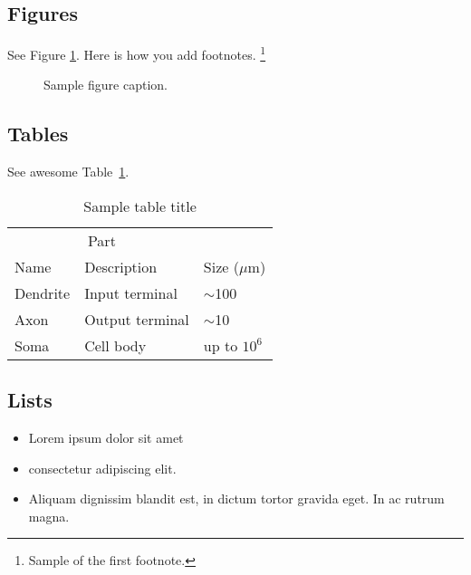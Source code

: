 \documentclass{article}
\begin{document}
\subsection{Figures}
\lipsum[10] 
See Figure \ref{fig:fig1}. Here is how you add footnotes. \footnote{Sample of the first footnote.}
\lipsum[11] 

\begin{figure}
  \centering
  \fbox{\rule[-.5cm]{4cm}{4cm} \rule[-.5cm]{4cm}{0cm}}
  \caption{Sample figure caption.}
  \label{fig:fig1}
\end{figure}

\subsection{Tables}
\lipsum[12]
See awesome Table~\ref{tab:table}.

\begin{table}
 \caption{Sample table title}
  \centering
  \begin{tabular}{lll}
    \toprule
    \multicolumn{2}{c}{Part}                   \\
    \cmidrule(r){1-2}
    Name     & Description     & Size ($\mu$m) \\
    \midrule
    Dendrite & Input terminal  & $\sim$100     \\
    Axon     & Output terminal & $\sim$10      \\
    Soma     & Cell body       & up to $10^6$  \\
    \bottomrule
  \end{tabular}
  \label{tab:table}
\end{table}

\subsection{Lists}
\begin{itemize}
\item Lorem ipsum dolor sit amet
\item consectetur adipiscing elit. 
\item Aliquam dignissim blandit est, in dictum tortor gravida eget. In ac rutrum magna.
\end{itemize}


  
\end{document}
